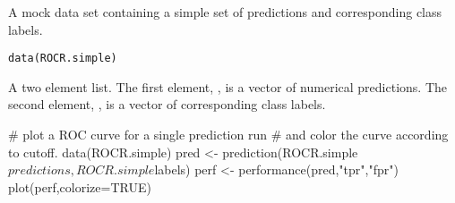 \begin{Description}\relax
A mock data set containing a simple set of predictions and
corresponding class labels.
\end{Description}
\begin{Usage}
\begin{verbatim}data(ROCR.simple)\end{verbatim}
\end{Usage}
\begin{Format}\relax
A two element list. The first element,
, is a vector of numerical predictions. The
second element, , is a vector of
corresponding class labels.
\end{Format}
\begin{Examples}
\begin{ExampleCode}
# plot a ROC curve for a single prediction run
# and color the curve according to cutoff.
data(ROCR.simple)
pred <- prediction(ROCR.simple$predictions, ROCR.simple$labels)
perf <- performance(pred,"tpr","fpr")
plot(perf,colorize=TRUE)
\end{ExampleCode}
\end{Examples}

